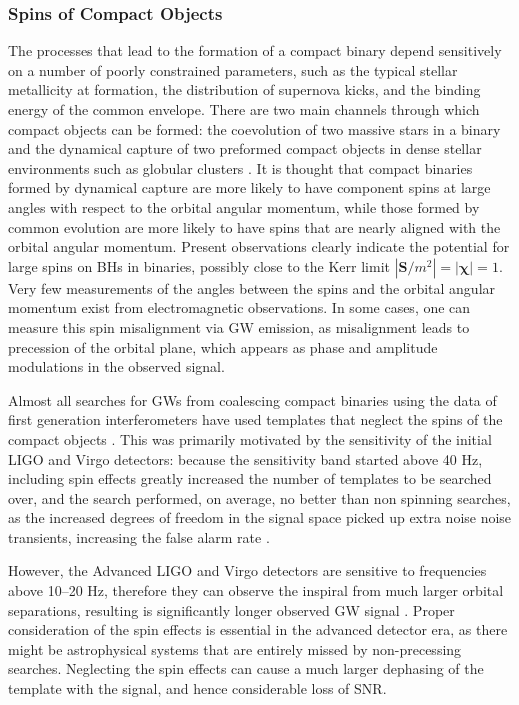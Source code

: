 \documentclass[binding=0.6cm, LaM]{sapthesis}
\begin{document}
\subsubsection{Spins of Compact Objects}
	The processes that lead to the formation of a compact binary
	depend sensitively on a number of poorly constrained parameters, 
	such as the typical stellar metallicity at formation, 
	the distribution of supernova kicks, 
	and the binding energy of the common envelope. 
	There are two main channels through which compact objects can be formed:
	the coevolution of two massive stars in a binary and 
	the dynamical capture of two preformed compact objects 
	in dense stellar environments such as globular clusters \cite{37}.	
	It is thought that compact binaries formed by dynamical capture 
	are more likely to have component spins
	at large angles with respect to the orbital angular momentum, 
	while those formed by common evolution are more likely to have 
	spins that are nearly aligned with the orbital angular momentum.
	Present observations clearly indicate the potential for large spins 
	on BHs in binaries, possibly close to the Kerr limit $|\mathbf{S}/m^2| = |\mathbf{\chi}| = 1$.
	Very few measurements of the angles between the spins and 
	the orbital angular momentum exist from electromagnetic observations. 
	In some cases, one can measure this spin misalignment via GW emission, 
	as misalignment leads to precession of the orbital plane, 
	which appears as phase and amplitude modulations in the observed signal.

	Almost all searches for GWs from coalescing compact binaries 
	using the data of first generation interferometers 
	have used templates that neglect the spins of the compact objects \cite{32}.
	This was primarily motivated by the sensitivity of the initial LIGO and Virgo detectors:
	because the sensitivity band started above 40 Hz, 
	including spin effects greatly increased the number of templates to be searched over, 
	and the search performed, on average, no better than non spinning searches, 	
	as the increased degrees of freedom in the signal space picked up extra noise noise transients, 	
	increasing the false alarm rate \cite{32, 38}.

	However, the Advanced LIGO and Virgo detectors are sensitive to frequencies above 10–20 Hz, 
	therefore they can observe the inspiral from much larger orbital separations, 
	resulting is significantly longer observed GW signal \cite{23}. 
	Proper consideration of the spin effects is essential in the advanced detector era, 
	as there might be astrophysical systems that are entirely missed by non-precessing searches.
	Neglecting the spin effects can cause a much larger dephasing of the template with the signal, 
	and hence considerable loss of SNR. 
\end{document}
